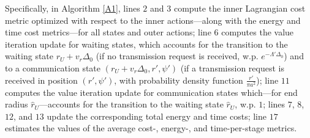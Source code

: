 \documentclass[12pt, draftcls, onecolumn]{IEEEtran}
\theoremstyle{plain}
\theoremstyle{definition}
\theoremstyle{remark}
\begin{document}
Specifically, in Algorithm \ref{A1}, lines $2$ and $3$ compute the inner Lagrangian cost metric optimized with respect to the inner actions---along with the energy and time cost metrics---for all states and outer actions; line $6$ computes the value iteration update for waiting states, which accounts for the transition to the waiting state $r_{U}{+}v_{r}\Delta_{0}$ (if no transmission request is received, w.p. $e^{-\Lambda'\Delta_{0}}$) and to a communication state $(r_{U}{+}v_{r}\Delta_{0},r',\psi')$ (if a transmission request is received in position $(r',\psi')$, with probability density function $\frac{r'}{\pi a^{2}}$); line $11$ computes the value iteration update for communication states which---for end radius $\hat{r}_{U}$---accounts for the transition to the waiting state $\hat{r}_{U}$, w.p. $1$; lines $7$, $8$, $12$, and $13$ update the corresponding total energy and time costs; line $17$ estimates the values of the average cost-, energy-, and time-per-stage metrics.
\end{document}
